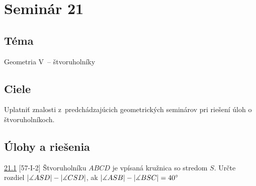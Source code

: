 \section*{Seminár 21}
\subsection*{Téma}
Geometria V~-- štvoruholníky

\subsection*{Ciele}
Uplatniť znalosti z~predchádzajúcich geometrických seminárov pri riešení úloh o štvoruholníkoch.

\subsection*{Úlohy a riešenia}
\begin{tcolorbox}[breakable,notitle,boxrule=0pt,colback=light-gray,colframe=light-gray]\ul{21.1} [57-I-2] Štvoruholníku $ABCD$ je vpísaná kružnica so stredom $S$. Určte rozdiel $|\measuredangle ASD|- |\measuredangle CSD|$, ak $|\measuredangle ASB| - |\measuredangle BSC| = 40^\circ$

\end{tcolorbox}

